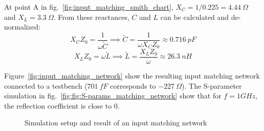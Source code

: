 \documentclass[report.tex]{subfiles}
\begin{document}
At point A in fig.~\ref{fig:input_matching_smith_chart}, $X_C=1/0.225=4.44~\Omega$ and $X_L=3.3~\Omega$. From these reactances, $C$ and $L$ can be calculated and de-normalized:
\begin{equation*}
X_C Z_0 = \frac{1}{\omega \tilde{C}} \implies \tilde{C} = \frac{1}{\omega X_C Z_0} \approx 0.716 ~pF
\end{equation*}
\begin{equation*}
X_L Z_0=\omega \tilde{L} \implies \tilde{L}=\frac{X_L Z_0}{\omega} \approx 26.3~nH
\end{equation*}

Figure~\ref{fig:input_matching_network} show the resulting input matching network connected to a testbench ($701~fF$ corresponds to $-227~\Omega$). The S-parameter simulation in fig.~\ref{fig:fig:S-params_matching_network} show that for $f=1GHz$, the reflection coefficient is close to 0.

\begin{figure}
    \centering
    
    \caption{Simulation setup and result of an input matching network}
\end{figure}

\clearpage %
\end{document}
